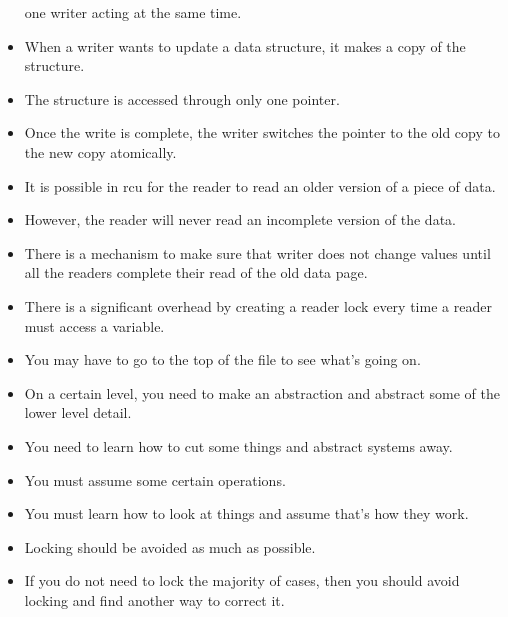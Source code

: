 \documentclass[]{article}
\begin{document}
\begin{itemize}
one writer acting at the same time.
\item When a writer wants to update a data structure, it makes a copy of the
structure.
\item The structure is accessed through only one pointer.
\item Once the write is complete, the writer switches the pointer to the old
copy to the new copy atomically.
\item It is possible in rcu for the reader to read an older version of a piece
of data.
\item However, the reader will never read an incomplete version of the data.
\item There is a mechanism to make sure that writer does not change values until
all the readers complete their read of the old data page.
\item There is a significant overhead by creating a reader lock every time a
reader must access a variable.
\item You may have to go to the top of the file to see what's going on.
\item On a certain level, you need to make an abstraction and abstract some of
the lower level detail.
\item You need to learn how to cut some things and abstract systems away.
\item You must assume some certain operations.
\item You must learn how to look at things and assume that's how they work.
\item Locking should be avoided as much as possible.
\item If you do not need to lock the majority of cases, then you should avoid
locking and find another way to correct it.
\end{itemize}
\end{document}
